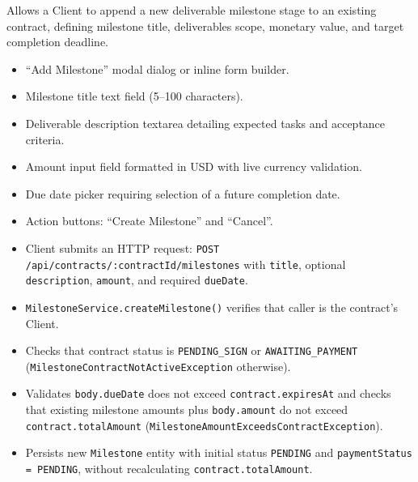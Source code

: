\noindent Allows a Client to append a new deliverable milestone stage to an existing contract, defining milestone title, deliverables scope, monetary value, and target completion deadline.

\begin{itemize}[leftmargin=1.6em,topsep=3pt,itemsep=2pt,parsep=0pt,label=$\bullet$]
      \item ``Add Milestone'' modal dialog or inline form builder.
      \item Milestone title text field (5--100 characters).
      \item Deliverable description textarea detailing expected tasks and acceptance criteria.
      \item Amount input field formatted in USD with live currency validation.
      \item Due date picker requiring selection of a future completion date.
      \item Action buttons: ``Create Milestone'' and ``Cancel''.
\end{itemize}

\begin{itemize}[leftmargin=1.6em,topsep=3pt,itemsep=2pt,parsep=0pt,label=$\bullet$]
      \item Client submits an HTTP request: \texttt{POST /\allowbreak{}api/\allowbreak{}contracts/\allowbreak{}:\allowbreak{}contractId/\allowbreak{}milestones} with \texttt{title}, optional \texttt{description}, \texttt{amount}, and required \texttt{dueDate}.
      \item \texttt{MilestoneService.createMilestone()} verifies that caller is the contract's Client.
      \item {\sloppy Checks that contract status is \texttt{PENDING\_SIGN} or \texttt{AWAITING\_PAYMENT} (\texttt{Milestone\allowbreak{}Contract\allowbreak{}Not\allowbreak{}Active\allowbreak{}Exception} otherwise).\par}
      \item Validates \texttt{body.dueDate} does not exceed \texttt{contract.expiresAt} and checks that existing milestone amounts plus \texttt{body.amount} do not exceed \texttt{contract.totalAmount} (\texttt{MilestoneAmountExceedsContractException}).
      \item Persists new \texttt{Milestone} entity with initial status \texttt{PENDING} and \texttt{paymentStatus = PENDING}, without recalculating \texttt{contract.totalAmount}.
\end{itemize}

